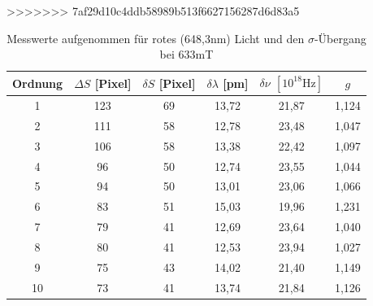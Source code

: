 >>>>>>> 7af29d10c4ddb58989b513f6627156287d6d83a5
\begin{table}[htbp]
    \begin{tabular}{|c|c|c|c|c|c|}
        Ordnung & $\Delta S$ [Pixel]    & $\delta S$ [Pixel]    &$\delta \lambda$ [pm]  & $\delta \nu$ $[10^{18}\text{Hz}]$ &   $g$\\\hline
        1&  123&    69& 13,72&  21,87&  1,124\\\hline
        2&  111&    58& 12,78&  23,48&  1,047\\\hline
        3&  106&    58& 13,38&  22,42&  1,097\\\hline
        4&  96&     50& 12,74&  23,55&  1,044\\\hline
        5&  94&     50& 13,01&  23,06&  1,066\\\hline
        6&  83&     51& 15,03&  19,96&  1,231\\\hline
        7&  79&     41& 12,69&  23,64&  1,040\\\hline
        8&  80&     41& 12,53&  23,94&  1,027\\\hline
        9&  75&     43& 14,02&  21,40&  1,149\\\hline
        10& 73&     41& 13,74&  21,84&  1,126\\\hline
    \end{tabular}
    \caption{Messwerte aufgenommen für rotes (648,3nm) Licht und den $\sigma$-Übergang bei 633mT}
    \label{tab_red_sigma}
\end{table}

